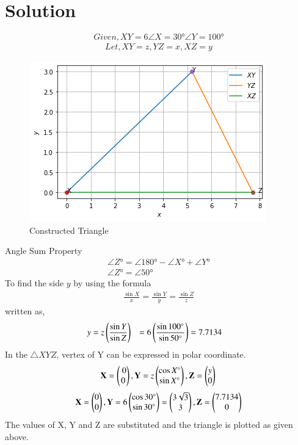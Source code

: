 \documentclass[journal,12pt,twocolumn]{IEEEtran}
\begin{document}
\section{Solution}
%
\begin{equation}
               Given, XY=6 \angle X=30\si{\degree} \angle Y=100\si{\degree}
\end{equation}
%
\begin{align}
Let, XY=z,  YZ=x,  XZ=y
\end{align}
%
\begin{figure}[!b]
 \centering
           \includegraphics[width=\columnwidth]{Figure_1.png}
           \caption{Constructed Triangle}
           \label{Figure}
\end{figure}
%
Angle  Sum  Property
%
\begin{align}
             \angle Z\si{\degree} = \angle 180\si{\degree} - \angle X\si{\degree} + \angle Y\si{\degree}\\
             \angle Z\si{\degree} = \angle 50\si{\degree}
\end{align}
%
To find the side $y$ by using the formula
%
\begin{align}
\frac{\sin{X}}{x} = \frac{\sin{Y}}{y} = \frac{\sin{Z}}{z}
\end{align}
%
written as,
%
\begin{align}
y&= z\left(\frac{\sin{Y}}{\sin{Z}}\right) 
&= 6 \left(\frac{\sin{\ang{100}}}{\sin{\ang{50}}}\right)
&= 7.7134
\end{align}
In the $\triangle XYZ$, vertex of Y can be expressed in polar coordinate.
\begin{equation}
\mathbf{X} = \begin{pmatrix}\ 0\\ 0\end{pmatrix}, \mathbf{Y} = z\begin{pmatrix} \cos X\si{\degree}\\ \sin X\si{\degree}\end{pmatrix} ,\mathbf{Z} =\begin{pmatrix}y \\ 0\end{pmatrix} \\
\\
\end{equation}
\begin{align}
\mathbf{X} =\begin{pmatrix}0 \\ 0\end{pmatrix},
\mathbf{Y} =6\begin{pmatrix}\cos{\ang{30}} \\ \sin{\ang{30}}\end{pmatrix} = \begin{pmatrix}3\sqrt{3} \\ 3 \end{pmatrix}, 
\mathbf{Z} =\begin{pmatrix}7.7134 \\ 0\end{pmatrix}
\end{align}
The values of X, Y and Z are substituted and the triangle is plotted as given above.
\end{document}
